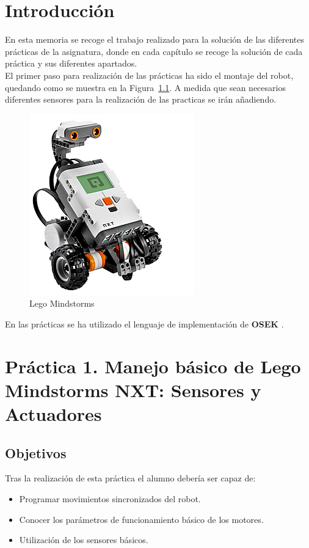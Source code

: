 
\chapter{Introducción}
En esta memoria se recoge el trabajo  realizado para la solución de las diferentes prácticas de la asignatura, donde	en cada capítulo se recoge la solución de cada práctica y sus diferentes apartados.\\

El primer paso para realización de las prácticas ha sido el montaje del robot, quedando como se muestra en la Figura~\ref{robot}. A medida que sean necesarios diferentes sensores para la realización de las practicas se irán añadiendo.
 
	\begin{figure}[H]
 \centering
 \includegraphics[scale=0.6]{./img/robot.jpg}
 \caption{Lego Mindstorms}
 \label{robot}
\end{figure}

En las prácticas se ha utilizado el lenguaje de implementación de \textbf{OSEK} \cite{NXTweb}.

\chapter{Práctica 1. Manejo básico de Lego Mindstorms NXT: Sensores y Actuadores}


\section{Objetivos}

Tras la realización de esta práctica el alumno debería ser capaz de:
\begin{itemize}
	\item Programar movimientos sincronizados del robot. 
	\item Conocer los parámetros de funcionamiento básico de los motores. 
	\item Utilización  de los sensores básicos. 
\end{itemize}


